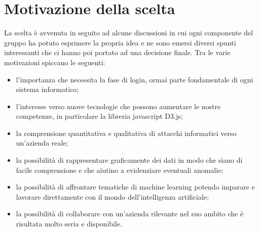 \section{Motivazione della scelta}

La scelta è avvenuta in seguito ad alcune discussioni in cui ogni componente del gruppo ha potuto esprimere la propria idea e ne sono emersi diversi spunti interessanti che ci hanno poi portato ad una decisione finale. Tra le varie motivazioni spiccano le seguenti:
\begin{itemize}
    \item l’importanza che necessita la fase di login, ormai parte fondamentale di ogni sistema informatico;
    \item l’interesse verso nuove tecnologie che possono aumentare le nostre competenze, in particolare la libreria javascript D3.js;
    \item la comprensione quantitativa e qualitativa di attacchi informatici verso un'azienda reale;
    \item la possibilità di rappresentare graficamente dei dati in modo che siano di facile comprensione e che aiutino a evidenziare eventuali anomalie;
    \item la possibilità di affrontare tematiche di machine learning potendo imparare e lavorare direttamente con il mondo dell’intelligenza artificiale;
    \item la possibilità di collaborare con un’azienda rilevante nel suo ambito che è risultata molto seria e disponibile.
\end{itemize}
